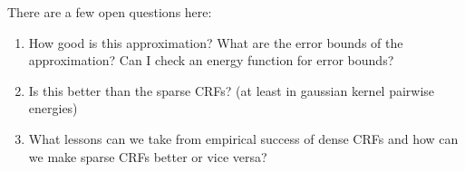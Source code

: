 \documentclass[10pt,twocolumn,letterpaper]{article}
\begin{document}
There are a few open questions here:
\begin{enumerate}
  \item How good is this approximation?  What are the error bounds of the
approximation? Can I check an energy function for error bounds?
\item Is this better than the sparse CRFs? (at least in gaussian kernel pairwise
energies)
\item What lessons can we take from empirical success of dense CRFs and how can
we make sparse CRFs better or vice versa?
  
\end{enumerate}



{\small


}
\end{document}

